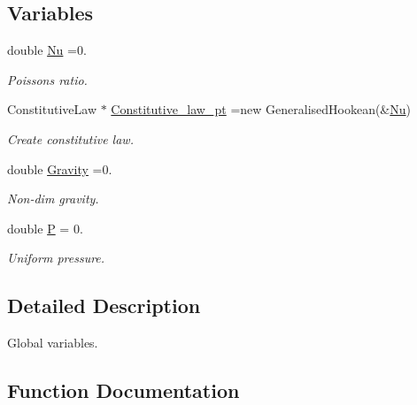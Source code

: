 \subsection*{Variables}
\begin{DoxyCompactItemize}
\item 
double \hyperlink{namespaceGlobal__Parameters_a20fccdcfa2c15ad8b951b9ada3bb1661}{Nu} =0.
\begin{DoxyCompactList}\small\item\em Poisson\textquotesingle{}s ratio. \end{DoxyCompactList}\item 
Constitutive\+Law $\ast$ \hyperlink{namespaceGlobal__Parameters_adbd1f040f375c96fe56b3f475f7dbec2}{Constitutive\+\_\+law\+\_\+pt} =new Generalised\+Hookean(\&\hyperlink{namespaceGlobal__Parameters_a20fccdcfa2c15ad8b951b9ada3bb1661}{Nu})
\begin{DoxyCompactList}\small\item\em Create constitutive law. \end{DoxyCompactList}\item 
double \hyperlink{namespaceGlobal__Parameters_a335000b5db4206486a116ae0468d2d0c}{Gravity} =0.
\begin{DoxyCompactList}\small\item\em Non-\/dim gravity. \end{DoxyCompactList}\item 
double \hyperlink{namespaceGlobal__Parameters_a31fb55c20db4aa0127aafa20f0d76731}{P} = 0.
\begin{DoxyCompactList}\small\item\em Uniform pressure. \end{DoxyCompactList}\end{DoxyCompactItemize}


\subsection{Detailed Description}
Global variables. 

\subsection{Function Documentation}
\mbox{\label{namespaceGlobal__Parameters_a7dc25ca2abd48b7f1bffb2d6129f02bd}} 
